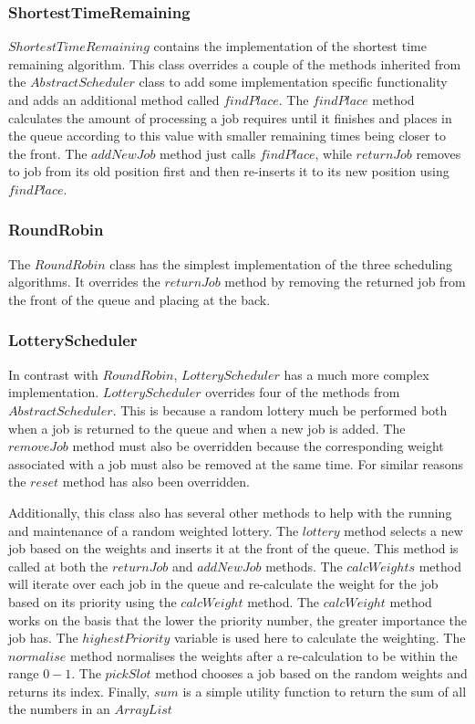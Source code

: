 \documentclass{article}
\begin{document}
\subsubsection{ShortestTimeRemaining}
$ShortestTimeRemaining$ contains the implementation of the shortest time remaining algorithm. This class overrides a couple of the methods inherited from the $AbstractScheduler$ class to add some implementation specific functionality and adds an additional method called $findPlace$. The $findPlace$ method calculates the amount of processing a job requires until it finishes and places in the queue according to this value with smaller remaining times being closer to the front. The $addNewJob$ method just calls $findPlace$, while $returnJob$ removes to job from its old position first and then re-inserts it to its new position using $findPlace$.

\subsubsection{RoundRobin}
The $RoundRobin$ class has the simplest implementation of the three scheduling algorithms. It overrides the $returnJob$ method by removing the returned job from the front of the queue and placing at the back.

\subsubsection{LotteryScheduler}
In contrast with $RoundRobin$, $LotteryScheduler$ has a much more complex implementation. $LotteryScheduler$ overrides four of the methods from $AbstractScheduler$. This is because a random lottery much be performed both when a job is returned to the queue and when a new job is added. The $removeJob$ method must also be overridden because the corresponding weight associated with a job must also be removed at the same time. For similar reasons the $reset$ method has also been overridden.

Additionally, this class also has several other methods to help with the running and maintenance of a random weighted lottery. The $lottery$ method selects a new job based on the weights and inserts it at the front of the queue. This method is called at both the $returnJob$ and $addNewJob$ methods. The $calcWeights$ method will iterate over each job in the queue and re-calculate the weight for the job based on its priority using the $calcWeight$ method. The $calcWeight$ method works on the basis that the lower the priority number, the greater importance the job has. The $highestPriority$ variable is used here to calculate the weighting. The $normalise$ method normalises the weights after a re-calculation to be within the range $0-1$. The $pickSlot$ method chooses a job based on the random weights and returns its index. Finally, $sum$ is a simple utility function to return the sum of all the numbers in an $ArrayList$
\end{document}
